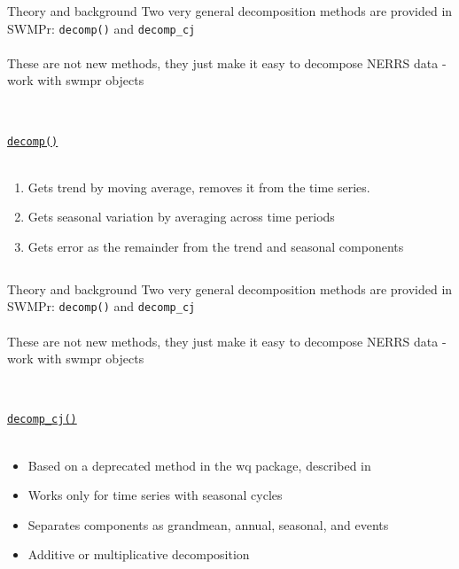 \documentclass[xcolor=dvipsnames,serif]{beamer}\usepackage[]{graphicx}\usepackage[]{color}
\begin{document}
\begin{frame}[t]{Theory and background}
Two very general decomposition methods are provided in SWMPr: \texttt{decomp()} and \texttt{decomp_cj} \\~\\
These are not new methods, they just make it easy to decompose NERRS data - work with swmpr objects \\~\\
\begin{columns}[t]
\begin{column}{\textwidth}
\underline{\texttt{decomp()}} \\~\\
\begin{enumerate}
\item Gets trend by moving average, removes it from the time series.
\item<2-> Gets seasonal variation by averaging across time periods
\item<3-> Gets error as the remainder from the trend and seasonal components
\end{enumerate}
\end{column}
\end{columns}
\end{frame}

\begin{frame}[t]{Theory and background}
Two very general decomposition methods are provided in SWMPr: \texttt{decomp()} and \texttt{decomp_cj} \\~\\
These are not new methods, they just make it easy to decompose NERRS data - work with swmpr objects  \\~\\
\begin{columns}[t]
\begin{column}{\textwidth}
\underline{\texttt{decomp_cj()}}\\~\\
\begin{itemize}
\item Based on a deprecated method in the wq package, described in \cite{Cloern10}
\item<2-> Works only for time series with seasonal cycles
\item<3-> Separates components as grandmean, annual, seasonal, and events
\item<4-> Additive or multiplicative decomposition
\end{itemize}
\end{column}
\end{columns}
\end{frame}
\end{document}
